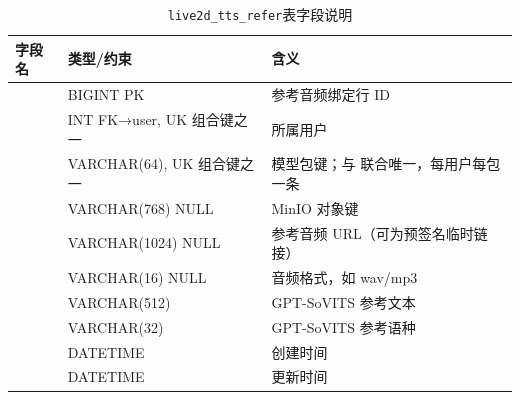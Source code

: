 \documentclass{base}
\begin{document}
\begin{table}[htbp]
    \centering
    \caption{\texttt{live2d\_tts\_refer}表字段说明}
    \label{tab:live2d_tts_refer_fields}
    \begingroup
    \small
    \sloppy
    \setlength{\tabcolsep}{7pt}
    \renewcommand{\arraystretch}{1.36}
    \begin{tabularx}{\textwidth}{@{} >{\raggedright\arraybackslash}p{3.25cm} >{\raggedright\arraybackslash}p{2.75cm} Y @{}}
        \toprule
        \textbf{字段名}               & \textbf{类型/约束}           & \textbf{含义}                                                          \\
        \midrule
                    & BIGINT PK                & 参考音频绑定行 ID                                                         \\
                     & INT FK→user, UK 组合键之一   & 所属用户                                                               \\
                 & VARCHAR(64), UK 组合键之一   & 模型包键；与  联合唯一，每用户每包一条                                   \\
            & VARCHAR(768) NULL          & MinIO 对象键                                                           \\
                   & VARCHAR(1024) NULL         & 参考音频 URL（可为预签名临时链接）                                                \\
                & VARCHAR(16) NULL           & 音频格式，如 wav/mp3                                                     \\
                 & VARCHAR(512)               & GPT-SoVITS 参考文本                                   \\
             & VARCHAR(32)                & GPT-SoVITS 参考语种                               \\
                 & DATETIME                   & 创建时间                                                               \\
                 & DATETIME                   & 更新时间                                                               \\
        \bottomrule
    \end{tabularx}
    \endgroup
\end{table}
\end{document}
